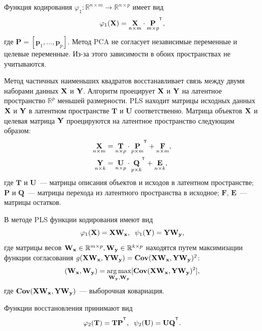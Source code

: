 Функция кодирования $\varphi_1: \mathbb{R}^{n \times m} \to \mathbb{R}^{n \times p}$ имеет вид
\begin{equation}
	\varphi_1(\bX) =  \underset{n \times m}\bX \cdot \underset{m \times p}\bP^{\T},
	\label{eq:PCA2}
\end{equation}
где $\textbf{P} = [\textbf{p}_1, \dots, \textbf{p}_{p}].$
Метод PCA не согласует независимые переменные и целевые переменные. Из-за этого зависимости в обоих пространствах не учитываются.


Метод частичных наименьших квадратов восстанавливает связь между двумя наборами данных $\mathbf{X}$ и $\mathbf{Y}$. Алгоритм проецирует $\mathbf{X}$ и $\mathbf{Y}$ на латентное пространство $\mathbb{R}^{p}$ меньшей размерности. PLS находит матрицы исходных данных $\mathbf{X}$ и $\mathbf{Y}$ в латентном пространстве $\textbf{T}$ и $\textbf{U}$ соответственно. Матрица объектов $\mathbf{X}$ и целевая матрица $\mathbf{Y}$ проецируются на латентное пространство следующим образом:
\begin{align}
	\underset{n \times m}{\bX}  &= \underset{n \times p}{\textbf{T}} \cdot \underset{p \times m}{\textbf{P}}^{\T} +  \underset{n \times m}{\textbf{F}},
	\label{eq:PLSpr1} \\
	\underset{n \times k}{\bY}  &= \underset{n \times p}{\textbf{U}} \cdot \underset{p \times k}{\bQ}^{\T} + \underset{n \times k}{\textbf{E}},
	\label{eq:PLSpr2}
\end{align}
где $\textbf{T}$ и $\textbf{U}$~--- матрицы описания объектов и исходов в латентном пространстве; $\textbf{P}$ и $\textbf{Q}$~--- матрицы перехода из латентного пространства в исходное; $\textbf{F}$, $\textbf{E}$~--- матрицы остатков.

В методе PLS  функции кодирования имеют вид
\begin{equation*}
	\varphi_1(\mathbf{X}) = \mathbf{X} \mathbf{W}_{\mathbf{x}}, \;\;
	\psi_1(\mathbf{Y}) = \mathbf{Y} \mathbf{W}_{\mathbf{y}},
\end{equation*}
где матрицы весов $\mathbf{W}_{\mathbf{x}} \in \mathbb{R}^{m \times p}, \mathbf{W}_{\mathbf{y}} \in \mathbb{R}^{k \times p}$ находятся путем максимизации функции согласования $g(\mathbf{X} \mathbf{W}_{\mathbf{x}},  \mathbf{Y} \mathbf{W}_{\mathbf{y}}) = \textbf{Cov} (\mathbf{X} \mathbf{W}_{\mathbf{x}},  \mathbf{Y} \mathbf{W}_{\mathbf{y}})^{2}$:
\begin{equation}
	(\mathbf{W}_{\mathbf{x}}, \mathbf{W}_{\mathbf{y}}) = \mathop{\arg \max}\limits_{\mathbf{W}_{\mathbf{y}}, \mathbf{W}_{\mathbf{y}}}[ \textbf{Cov}(\mathbf{X} \mathbf{W}_{\mathbf{x}}, \mathbf{Y} \mathbf{W}_{\mathbf{y}})^{2}],
\label{eq:PLSpr3}
\end{equation}
где $\textbf{Cov}(\mathbf{X} \mathbf{W}_{\mathbf{x}}, \mathbf{Y} \mathbf{W}_{\mathbf{y}})$~--- выборочная ковариация.

Функции восстановления принимают вид
\begin{equation*}
	\varphi_2(\bT) = \bT\bP^{\T}, \;\;
	\psi_2(\bU) = \bU \bQ^{\T}.
\end{equation*}

